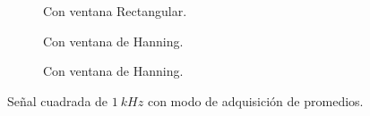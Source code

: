 \begin{figure}[H]
\begin{subfigure}[H]{0.40\textwidth}
          \caption{Con ventana Rectangular.}
        \end{subfigure}
        \hfill 
        \begin{subfigure}[H]{0.40\textwidth}
          \caption{Con ventana de Hanning.}
        \end{subfigure}
        \hfill 
        \begin{subfigure}[H]{0.40\textwidth}
          \caption{Con ventana de Hanning.}
        \end{subfigure}

        \caption{Señal cuadrada de $1~kHz$ con modo de adquisición de promedios.}
        \label{fig:SeñalCuad_MedicFrecOscilo}
      \end{figure}

